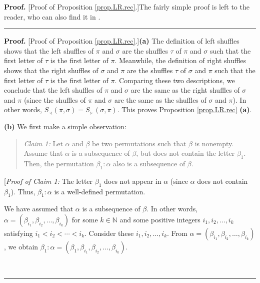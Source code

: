 \documentclass[numbers=enddot,12pt,final,onecolumn,notitlepage]{scrartcl}%
\theoremstyle{definition}
\newenvironment{statement}{\begin{quote}}{\end{quote}}
\newenvironment{proof}[1][Proof]{\noindent\textbf{#1.} }{\ \rule{0.5em}{0.5em}}
\newenvironment{verlong}{}{}
\newenvironment{vershort}{}{}
\begin{document}
\begin{vershort}
\begin{proof}
[Proof of Proposition \ref{prop.LR.rec}.]The fairly simple proof is left to
the reader, who can also find it in \cite{verlong}.
\end{proof}
\end{vershort}

\begin{verlong}
\begin{proof}
[Proof of Proposition \ref{prop.LR.rec}.]\textbf{(a)} The definition of left
shuffles shows that the left shuffles of $\pi$ and $\sigma$ are the shuffles
$\tau$ of $\pi$ and $\sigma$ such that the first letter of $\tau$ is the first
letter of $\pi$. Meanwhile, the definition of right shuffles shows that the
right shuffles of $\sigma$ and $\pi$ are the shuffles $\tau$ of $\sigma$ and
$\pi$ such that the first letter of $\tau$ is the first letter of $\pi$.
Comparing these two descriptions, we conclude that the left shuffles of $\pi$
and $\sigma$ are the same as the right shuffles of $\sigma$ and $\pi$ (since
the shuffles of $\pi$ and $\sigma$ are the same as the shuffles of $\sigma$
and $\pi$). In other words, $S_{\prec}\left(  \pi,\sigma\right)  =S_{\succ
}\left(  \sigma,\pi\right)  $. This proves Proposition \ref{prop.LR.rec}
\textbf{(a)}.

\textbf{(b)} We first make a simple observation:

\begin{statement}
\textit{Claim 1:} Let $\alpha$ and $\beta$ be two permutations such that
$\beta$ is nonempty. Assume that $\alpha$ is a subsequence of $\beta$,
but does not contain the letter $\beta_{1}$. Then, the permutation $\beta
_{1}:\alpha$ also is a subsequence of $\beta$.
\end{statement}

[\textit{Proof of Claim 1:} The letter $\beta_{1}$ does not appear in $\alpha$
(since $\alpha$ does not contain $\beta_{1}$). Thus, $\beta_{1}:\alpha$ is a
well-defined permutation.

We have assumed that $\alpha$ is a subsequence of $\beta$. In other
words, $\alpha=\left(  \beta_{i_{1}},\beta_{i_{2}},\ldots,\beta_{i_{k}%
}\right)  $ for some $k\in\mathbb{N}$ and some positive integers $i_{1}%
,i_{2},\ldots,i_{k}$ satisfying $i_{1}<i_{2}<\cdots<i_{k}$. Consider these
$i_{1},i_{2},\ldots,i_{k}$. From $\alpha=\left(  \beta_{i_{1}},\beta_{i_{2}%
},\ldots,\beta_{i_{k}}\right)  $, we obtain $\beta_{1}:\alpha=\left(
\beta_{1},\beta_{i_{1}},\beta_{i_{2}},\ldots,\beta_{i_{k}}\right)  $.


\end{proof}
\end{verlong}
\end{document}
